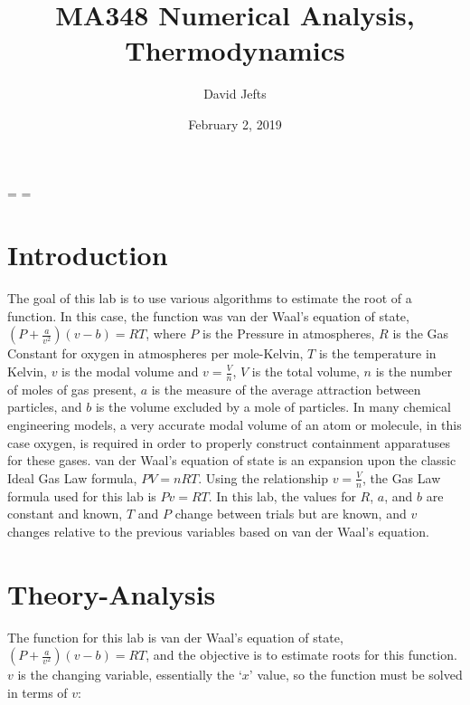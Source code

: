 \documentclass[12pt, letterpaper]{article}
\begin{document}
\setcounter{secnumdepth}{-1}
\binoppenalty=\maxdimen
\relpenalty=\maxdimen

\title{MA348 Numerical Analysis, Thermodynamics}
\author{David Jefts}
\date{February 2, 2019}
\begin{titlepage}
	\centering
	\maketitle
	\centering
	\hfill
	\vfill
\end{titlepage}

\setlength{\voffset}{-0.5in}
\setlength{\headsep}{10pt}

\section{Introduction}
	The goal of this lab is to use various algorithms to estimate the root of a function. In this case, the function was van der Waal's equation of state, ${(P+\frac{a}{v^2})(v-b)=RT}$, where $P$ is the Pressure in atmospheres, $R$ is the Gas Constant for oxygen in atmospheres per mole-Kelvin, $T$ is the temperature in Kelvin, $v$ is the modal volume and ${v=\frac{V}{n}}$, $V$ is the total volume, $n$ is the number of moles of gas present, $a$ is the measure of the average attraction between particles, and $b$ is the volume excluded by a mole of particles. In many chemical engineering models, a very accurate modal volume of an atom or molecule, in this case oxygen,  is required in order to properly construct containment apparatuses for these gases. van der Waal's equation of state is an expansion upon the classic Ideal Gas Law formula, ${PV=nRT}$. Using the relationship ${v=\frac{V}{n}}$, the Gas Law formula used for this lab is $Pv=RT$. In this lab, the values for $R$, $a$, and $b$ are constant and known, $T$ and $P$ change between trials but are known, and $v$ changes relative to the previous variables based on van der Waal's equation.

\section{Theory-Analysis}
	 The function for this lab is van der Waal's equation of state, ${(P+\frac{a}{v^2})(v-b)=RT}$, and the objective is to estimate roots for this function. $v$ is the changing variable, essentially the `$x$' value, so the function must be solved in terms of $v$:
\end{document}
